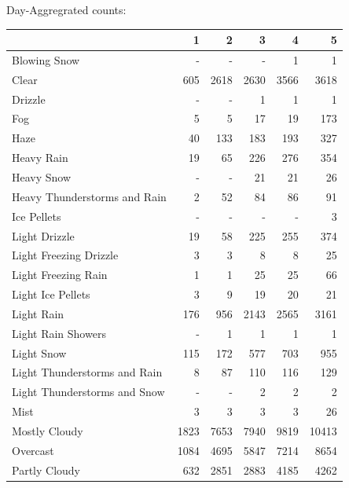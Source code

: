 \documentclass[11pt]{scrartcl}
\begin{document}
Day-Aggregrated counts:
\begin{tabular}{lrrrrr}
\toprule
{} &     1 &     2 &     3 &     4 &      5 \\
\midrule
Blowing Snow                  &   - &   - &   - &     1 &      1 \\
Clear                         &   605 &  2618 &  2630 &  3566 &   3618 \\
Drizzle                       &   - &   - &     1 &     1 &      1 \\
Fog                           &     5 &     5 &    17 &    19 &    173 \\
Haze                          &    40 &   133 &   183 &   193 &    327 \\
Heavy Rain                    &    19 &    65 &   226 &   276 &    354 \\
Heavy Snow                    &   - &   - &    21 &    21 &     26 \\
Heavy Thunderstorms and Rain  &     2 &    52 &    84 &    86 &     91 \\
Ice Pellets                   &   - &   - &   - &   - &      3 \\
Light Drizzle                 &    19 &    58 &   225 &   255 &    374 \\
Light Freezing Drizzle        &     3 &     3 &     8 &     8 &     25 \\
Light Freezing Rain           &     1 &     1 &    25 &    25 &     66 \\
Light Ice Pellets             &     3 &     9 &    19 &    20 &     21 \\
Light Rain                    &   176 &   956 &  2143 &  2565 &   3161 \\
Light Rain Showers            &   - &     1 &     1 &     1 &      1 \\
Light Snow                    &   115 &   172 &   577 &   703 &    955 \\
Light Thunderstorms and Rain  &     8 &    87 &   110 &   116 &    129 \\
Light Thunderstorms and Snow  &   - &   - &     2 &     2 &      2 \\
Mist                          &     3 &     3 &     3 &     3 &     26 \\
Mostly Cloudy                 &  1823 &  7653 &  7940 &  9819 &  10413 \\
Overcast                      &  1084 &  4695 &  5847 &  7214 &   8654 \\
Partly Cloudy                 &   632 &  2851 &  2883 &  4185 &   4262 \\

\end{tabular}
\end{document}
